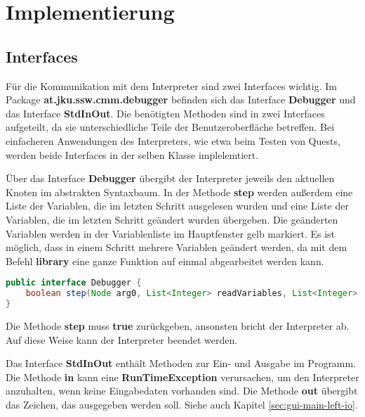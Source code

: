 

\section{Implementierung}


\subsection{Interfaces}
\label{sec:deb-impl-interfaces}
Für die Kommunikation mit dem Interpreter sind zwei Interfaces wichtig. Im Package \textbf{at.jku.ssw.cmm.debugger} befinden sich das Interface \textbf{Debugger} und das Interface \textbf{StdInOut}. Die benötigten Methoden sind in zwei Interfaces aufgeteilt, da sie unterschiedliche Teile der Benutzeroberfläche betreffen. Bei einfacheren Anwendungen des Interpreters, wie etwa beim Testen von Quests, werden beide Interfaces in der selben Klasse implelemtiert.

Über das Interface \textbf{Debugger} übergibt der Interpreter jeweils den aktuellen Knoten im abstrakten Syntaxbaum. In der Methode \textbf{step} werden außerdem eine Liste der Variablen, die im letzten Schritt ausgelesen wurden und eine Liste der Variablen, die im letzten Schritt geändert wurden übergeben. Die geänderten Variablen werden in der Variablenliste im Hauptfenster gelb markiert. Es ist möglich, dass in einem Schritt mehrere Variablen geändert werden, da mit dem Befehl \textbf{library} eine ganze Funktion auf einmal abgearbeitet werden kann.

\begin{lstlisting}[language=JAVA]
public interface Debugger {
	boolean step(Node arg0, List<Integer> readVariables, List<Integer> changedVariables);
}
\end{lstlisting}

Die Methode \textbf{step} muss \textbf{true} zurückgeben, ansonsten bricht der Interpreter ab. Auf diese Weise kann der Interpreter beendet werden.

Das Interface \textbf{StdInOut} enthält Methoden zur Ein- und Ausgabe im Programm. Die Methode \textbf{in} kann eine \textbf{RunTimeException} verursachen, um den Interpreter anzuhalten, wenn keine Eingabedaten vorhanden sind. Die Methode \textbf{out} übergibt das Zeichen, das ausgegeben werden soll. Siehe auch Kapitel \ref{sec:gui-main-left-io}.


